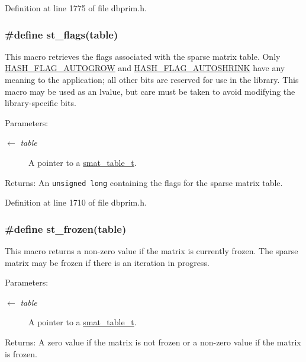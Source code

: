 Definition at line 1775 of file dbprim.h.\hypertarget{group__dbprim__smat_ga35}{
\subsubsection[st\_\-flags]{\setlength{\rightskip}{0pt plus 5cm}\#define st\_\-flags(table)}}
\label{group__dbprim__smat_ga35}


This macro retrieves the flags associated with the sparse matrix table. Only \hyperlink{group__dbprim__hash_ga23}{HASH\_\-FLAG\_\-AUTOGROW} and \hyperlink{group__dbprim__hash_ga24}{HASH\_\-FLAG\_\-AUTOSHRINK} have any meaning to the application; all other bits are reserved for use in the library. This macro may be used as an lvalue, but care must be taken to avoid modifying the library-specific bits.

\begin{Desc}
\item[Parameters:]
\begin{description}
\item[\mbox{$\leftarrow$} {\em table}]A pointer to a \hyperlink{group__dbprim__smat_ga0}{smat\_\-table\_\-t}.\end{description}
\end{Desc}
\begin{Desc}
\item[Returns:]An {\tt unsigned long} containing the flags for the sparse matrix table.\end{Desc}


Definition at line 1710 of file dbprim.h.\hypertarget{group__dbprim__smat_ga36}{
\subsubsection[st\_\-frozen]{\setlength{\rightskip}{0pt plus 5cm}\#define st\_\-frozen(table)}}
\label{group__dbprim__smat_ga36}


This macro returns a non-zero value if the matrix is currently frozen. The sparse matrix may be frozen if there is an iteration in progress.

\begin{Desc}
\item[Parameters:]
\begin{description}
\item[\mbox{$\leftarrow$} {\em table}]A pointer to a \hyperlink{group__dbprim__smat_ga0}{smat\_\-table\_\-t}.\end{description}
\end{Desc}
\begin{Desc}
\item[Returns:]A zero value if the matrix is not frozen or a non-zero value if the matrix is frozen.\end{Desc}


